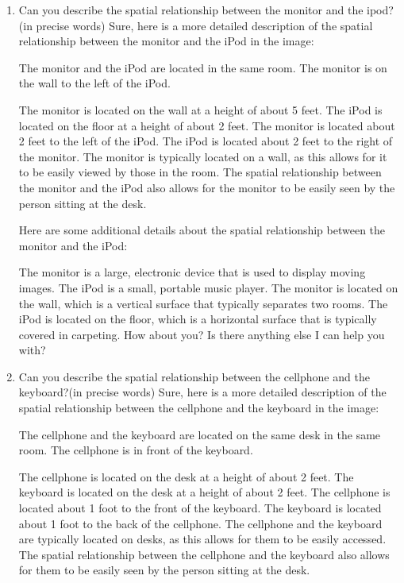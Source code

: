 \begin{enumerate}
    \item Can you describe the spatial relationship between the monitor and the ipod?(in precise words)
    \subitem Sure, here is a more detailed description of the spatial relationship between the monitor and the iPod in the image:

    The monitor and the iPod are located in the same room. The monitor is on the wall to the left of the iPod.
    
    The monitor is located on the wall at a height of about 5 feet.
    The iPod is located on the floor at a height of about 2 feet.
    The monitor is located about 2 feet to the left of the iPod.
    The iPod is located about 2 feet to the right of the monitor.
    The monitor is typically located on a wall, as this allows for it to be easily viewed by those in the room. The spatial relationship between the monitor and the iPod also allows for the monitor to be easily seen by the person sitting at the desk.
    
    Here are some additional details about the spatial relationship between the monitor and the iPod:
    
    The monitor is a large, electronic device that is used to display moving images.
    The iPod is a small, portable music player.
    The monitor is located on the wall, which is a vertical surface that typically separates two rooms.
    The iPod is located on the floor, which is a horizontal surface that is typically covered in carpeting.
    How about you? Is there anything else I can help you with?
    \item Can you describe the spatial relationship between the cellphone and the keyboard?(in precise words)
    \subitem Sure, here is a more detailed description of the spatial relationship between the cellphone and the keyboard in the image:

    The cellphone and the keyboard are located on the same desk in the same room. The cellphone is in front of the keyboard.
    
    The cellphone is located on the desk at a height of about 2 feet.
    The keyboard is located on the desk at a height of about 2 feet.
    The cellphone is located about 1 foot to the front of the keyboard.
    The keyboard is located about 1 foot to the back of the cellphone.
    The cellphone and the keyboard are typically located on desks, as this allows for them to be easily accessed. The spatial relationship between the cellphone and the keyboard also allows for them to be easily seen by the person sitting at the desk.
    

\end{enumerate}
